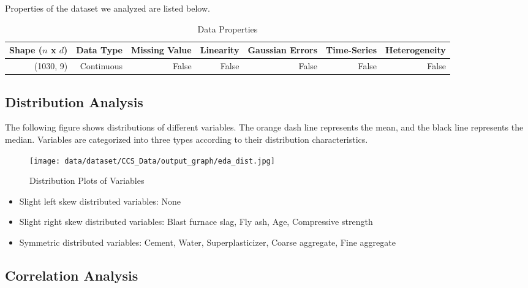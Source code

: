 \documentclass{article}
\begin{document}
Properties of the dataset we analyzed are listed below.

\begin{table}[H]
    \centering
    \caption{Data Properties}

    \begin{tabular}{rrrrrrr}
    \toprule
    Shape ($n$ x $d$) & Data Type & Missing Value & Linearity & Gaussian Errors & Time-Series & Heterogeneity \\
    \midrule
    (1030, 9)   & Continuous & False & False & False & False & False \\
    \bottomrule
    \end{tabular}
        
\end{table}


\subsection{Distribution Analysis}
The following figure shows distributions of different variables. The orange dash line represents the mean, 
and the black line represents the median. Variables are categorized into three types according to their distribution characteristics.

\begin{figure}[H]
\centering
\texttt{[image: data/dataset/CCS\_Data/output\_graph/eda\_dist.jpg]}
\caption{\label{fig:dist}Distribution Plots of Variables}
\end{figure}

\begin{itemize}
\item Slight left skew distributed variables: None
\item Slight right skew distributed variables: Blast furnace slag, Fly ash, Age, Compressive strength
\item Symmetric distributed variables: Cement, Water, Superplasticizer, Coarse aggregate, Fine aggregate
\end{itemize}

\subsection{Correlation Analysis}
\end{document}
